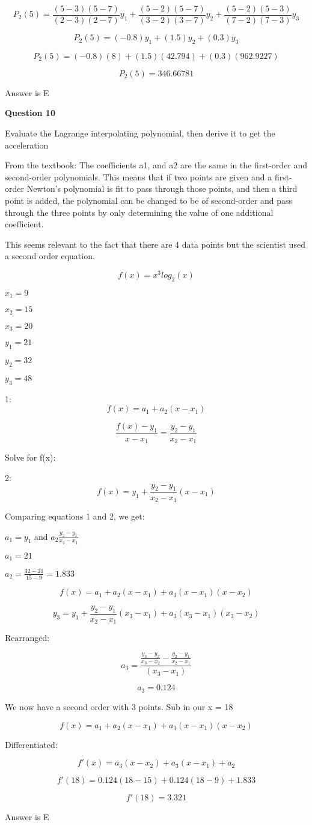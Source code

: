 \documentclass{article}
\begin{document}
\[P_2(5) = \frac{(5-3)(5-7)}{(2 - 3)(2 - 7)}y_1 +  \frac{(5-2)(5-7)}{(3 - 2)(3 - 7)}y_2 + \frac{(5-2)(5-3)}{(7 - 2)(7 - 3)}y_3\]

\[P_2(5) = (-0.8)y_1 + (1.5)y_2 + (0.3)y_3\]

\[P_2(5) = (-0.8)(8) + (1.5)(42.794) + (0.3)(962.9227)\]

\[P_2(5) = 346.66781\]

Answer is E


\textbf{Question 10}

Evaluate the Lagrange interpolating polynomial, then derive it to get the acceleration

From the textbook: The coefficients a1, and a2 are the same in the first-order and second-order polynomials. This means that if two points are given and a 
first-order Newton's polynomial is fit to pass through those points, and 
then a third point is added, the polynomial can be changed to be of second-order and pass through the three points by only determining the value of one additional coefficient.

This seems relevant to the fact that there are 4 data points but the scientist used a second order equation.

\[f(x) = x^3log_2(x)\]

$x_1 = 9$

$ x_2 = 15$

$ x_3 = 20$

$y_1 = 21$

$ y_2 = 32$

$ y_3 = 48$

1: \[f(x) = a_1 + a_2(x-x_1)\]

\[\frac{f(x) - y_1}{x - x_1} = \frac{y_2 - y_1}{x_2 - x_1}\]

Solve for f(x):

2: \[f(x) = y_1 + \frac{y_2-y_1}{x_2-x_1}(x-x_1)\]

Comparing equations 1 and 2, we get:

$a_1 = y_1$ and $a_2 \frac{y_2-y_1}{x_2-x_1}$

$a_1 = 21$

$a_2 = \frac{32-21}{15-9} = 1.833$

\[f(x) = a_1 + a_2(x-x_1)+a_3(x-x_1)(x-x_2)\]

\[y_3 = y_1 + \frac{y_2-y_1}{x_2-x_1}(x_3 - x_1) + a_3(x_3 - x_1)(x_3 - x_2)\]

Rearranged:

\[a_3 = \frac{\frac{y_3-y_2}{x_3-x_2} - \frac{y_2-y_1}{x_2-x_1}}{(x_3-x_1)}\]

\[a_3 = 0.124 \]

We now have a second order with 3 points. Sub in our x = 18

\[f(x) = a_1 + a_2(x-x_1)+a_3(x-x_1)(x-x_2)\]

Differentiated:

\[f'(x) = a_3(x-x_2) + a_3(x-x_1) + a_2\]

\[f'(18) = 0.124(18-15) + 0.124(18-9) + 1.833\]

\[f'(18) = 3.321\]

Answer is E
\end{document}
